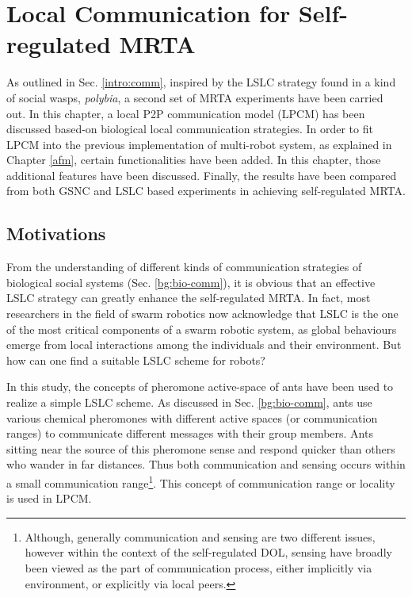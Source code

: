 \chapter{Local Communication for Self-regulated MRTA}
\label{local-comm}
As outlined in Sec. \ref{intro:comm}, inspired by the LSLC strategy found in a kind of social wasps, {\em polybia},  a second set of MRTA experiments have been carried out. In this chapter, a local P2P communication  model (LPCM) has been discussed based-on biological local communication strategies. In order to fit LPCM into the previous implementation of multi-robot system, as explained in Chapter \ref{afm},  certain functionalities  have been added. In this chapter,  those additional features have been discussed. Finally,  the results  have been compared from both GSNC and LSLC based experiments in achieving self-regulated MRTA. 
\section{Motivations}
From the understanding of different kinds of communication strategies of biological social systems (Sec. \ref{bg:bio-comm}), it is obvious that an effective LSLC strategy can greatly enhance the self-regulated MRTA.  In fact, most  researchers in the field of swarm robotics now acknowledge that LSLC is the one of the most critical components of a swarm robotic system, as global behaviours emerge from local interactions among the individuals and their environment. But how can one find a suitable LSLC scheme for robots?

In this study, the concepts of pheromone active-space of ants  have been used to realize a simple LSLC scheme. As discussed in Sec. \ref{bg:bio-comm}, ants use various chemical pheromones with different active spaces (or communication ranges) to communicate different messages with their group members. Ants sitting near the source of this pheromone sense and respond quicker than others who wander in far distances. Thus both communication and sensing occurs within a small communication range\footnote{Although, generally communication and sensing are two different issues, however within the context of the self-regulated DOL,   sensing have broadly been viewed as the part of communication process, either implicitly via environment, or explicitly via local peers.}. This concept of communication range or locality is used in LPCM.

